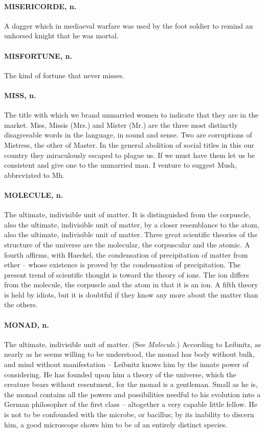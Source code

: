 \documentclass[11pt]{article}
\begin{document}
\paragraph{MISERICORDE, n.}  A dagger which in mediaeval warfare was used by the
foot soldier to remind an unhorsed knight that he was mortal.

\paragraph{MISFORTUNE, n.}  The kind of fortune that never misses.

\paragraph{MISS, n.}  The title with which we brand unmarried women to indicate
that they are in the market.  Miss, Missis (Mrs.) and Mister (Mr.) are
the three most distinctly disagreeable words in the language, in sound
and sense.  Two are corruptions of Mistress, the other of Master.  In
the general abolition of social titles in this our country they
miraculously escaped to plague us.  If we must have them let us be
consistent and give one to the unmarried man.  I venture to suggest
Mush, abbreviated to Mh.

\paragraph{MOLECULE, n.}  The ultimate, indivisible unit of matter.  It is
distinguished from the corpuscle, also the ultimate, indivisible unit
of matter, by a closer resemblance to the atom, also the ultimate,
indivisible unit of matter.  Three great scientific theories of the
structure of the universe are the molecular, the corpuscular and the
atomic.  A fourth affirms, with Haeckel, the condensation of
precipitation of matter from ether -- whose existence is proved by the
condensation of precipitation.  The present trend of scientific
thought is toward the theory of ions.  The ion differs from the
molecule, the corpuscle and the atom in that it is an ion.  A fifth
theory is held by idiots, but it is doubtful if they know any more
about the matter than the others.

\paragraph{MONAD, n.}  The ultimate, indivisible unit of matter.  (See
{\em Molecule}.)  According to Leibnitz, as nearly as he seems willing to
be understood, the monad has body without bulk, and mind without
manifestation -- Leibnitz knows him by the innate power of
considering.  He has founded upon him a theory of the universe, which
the creature bears without resentment, for the monad is a gentleman.
Small as he is, the monad contains all the powers and possibilities
needful to his evolution into a German philosopher of the first class
-- altogether a very capable little fellow.  He is not to be
confounded with the microbe, or bacillus; by its inability to discern
him, a good microscope shows him to be of an entirely distinct
species.
\end{document}
